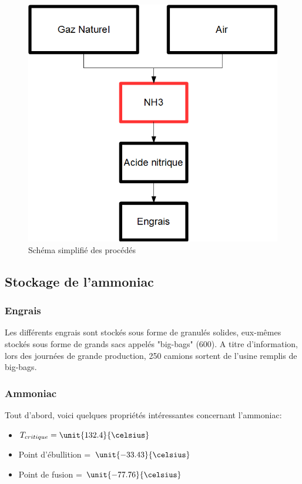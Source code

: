 \begin{figure} [h]
\begin{center}
\includegraphics[scale=0.4]{FlYara.png}
\end{center}
\caption{Schéma simplifié des procédés}
\end{figure}
\subsection{Stockage de l'ammoniac}
\subsubsection{Engrais}
Les différents engrais sont stockés sous forme de granulés solides, eux-mêmes stockés sous forme de grands sacs appelés "big-bags" (\unit{600}{\kilogram}). A titre d'information, lors des journées de grande production, 250 camions sortent de l'usine remplis de big-bags. 
\subsubsection{Ammoniac}
Tout d'abord, voici quelques propriétés intéressantes concernant l'ammoniac:

\begin{itemize}
\item{$T_{critique} = \unit{132.4}{\celsius}$}

\item{Point d'ébullition = $\unit{-33.43}{\celsius}$}

\item{Point de fusion = $\unit{-77.76}{\celsius}$}
\end{itemize}

